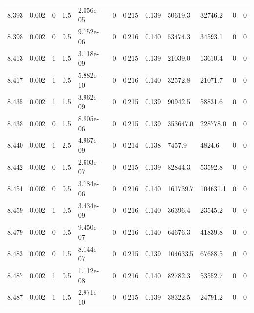 \documentclass[preview]{standalone}
\begin{document}
{{{{{{{{{{{{{{\begin{tabular}{L{1.2cm}C{1.2cm} C{0.3cm}C{0.5cm} C{1.4cm}C{1.4cm} C{1.4cm}C{1.4cm} C{1.6cm}C{1.6cm} C{1.6cm}C{1.6cm}}
  8.393  &  0.002  & 0     & 1.5 &  2.056e-05  & 0  &  0.215&   0.139& 50619.3 & 32746.2   &  0 & 0  \\ 
  8.398  &  0.002  & 0     & 0.5 &  9.752e-06  & 0  &  0.216&   0.140& 53474.3 & 34593.1   &  0 & 0  \\ 
  8.413  &  0.002  & 1     & 1.5 &  3.118e-09  & 0  &  0.215&   0.139& 21039.0 & 13610.4   &  0 & 0  \\ 
  8.417  &  0.002  & 1     & 0.5 &  5.882e-10  & 0  &  0.216&   0.140& 32572.8 & 21071.7   &  0 & 0  \\ 
  8.435  &  0.002  & 1     & 1.5 &  3.962e-09  & 0  &  0.215&   0.139& 90942.5 & 58831.6   &  0 & 0  \\ 
  8.438  &  0.002  & 0     & 1.5 &  8.805e-06  & 0  &  0.215&   0.139& 353647.0 & 228778.0   &  0 & 0  \\ 
  8.440  &  0.002  & 1     & 2.5 &  4.967e-09  & 0  &  0.214&   0.138& 7457.9 & 4824.6   &  0 & 0  \\ 
  8.442  &  0.002  & 0     & 1.5 &  2.603e-07  & 0  &  0.215&   0.139& 82844.3 & 53592.8   &  0 & 0  \\ 
  8.454  &  0.002  & 0     & 0.5 &  3.784e-06  & 0  &  0.216&   0.140& 161739.7 & 104631.1   &  0 & 0  \\ 
  8.459  &  0.002  & 1     & 0.5 &  3.434e-09  & 0  &  0.216&   0.140& 36396.4 & 23545.2   &  0 & 0  \\ 
  8.479  &  0.002  & 0     & 0.5 &  9.450e-07  & 0  &  0.216&   0.140& 64676.3 & 41839.8   &  0 & 0  \\ 
  8.483  &  0.002  & 0     & 1.5 &  8.144e-07  & 0  &  0.215&   0.139& 104633.5 & 67688.5   &  0 & 0  \\ 
  8.487  &  0.002  & 1     & 0.5 &  1.112e-08  & 0  &  0.216&   0.140& 82782.3 & 53552.7   &  0 & 0  \\ 
  8.487  &  0.002  & 1     & 1.5 &  2.971e-10  & 0  &  0.215&   0.139& 38322.5 & 24791.2   &  0 & 0  \\ 
\hline 
\end{tabular} 

}}}}}}}}}}}}}}
\end{document}
